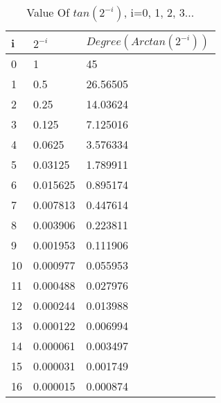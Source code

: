 \begin{table}[!htbp]
  \centering
  \caption{Value Of $tan(2^{-i})$, i=0, 1, 2, 3...}
    \begin{tabular}{|l|l|l|}
    \toprule
    i     &   $2^{-i}$    & $Degree(Arctan(2^{-i})) $   \\
    \midrule
    0     & 1  & 45 \\
    1     & 0.5  & 26.56505 \\
    2     & 0.25  & 14.03624 \\
    3     & 0.125  & 7.125016 \\
    4     & 0.0625  & 3.576334 \\
    5     & 0.03125  & 1.789911 \\
    6     & 0.015625  & 0.895174 \\
    7     & 0.007813  & 0.447614 \\
    8     & 0.003906  & 0.223811 \\
    9     & 0.001953  & 0.111906 \\
    10    & 0.000977  & 0.055953 \\
    11    & 0.000488  & 0.027976 \\
    12    & 0.000244  & 0.013988 \\
    13    & 0.000122  & 0.006994 \\
    14    & 0.000061  & 0.003497 \\
    15    & 0.000031  & 0.001749 \\
    16    & 0.000015  & 0.000874 \\
    \bottomrule
    \end{tabular}%
  \label{tab:ValueOfTan}%
\end{table}%
